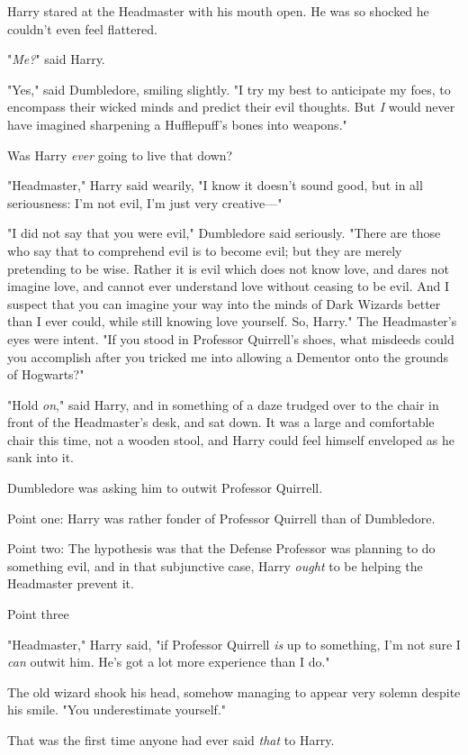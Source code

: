Harry stared at the Headmaster with his mouth open. He was so shocked he
couldn't even feel flattered.

"\emph{Me?}" said Harry.

"Yes," said Dumbledore, smiling slightly. "I try my best to anticipate my foes,
to encompass their wicked minds and predict their evil thoughts. But \emph{I}
would never have imagined sharpening a Hufflepuff's bones into weapons."

Was Harry \emph{ever} going to live that down?

"Headmaster," Harry said wearily, "I know it doesn't sound good, but in all
seriousness: I'm not evil, I'm just very creative\mbox{---}"

"I did not say that you were evil," Dumbledore said seriously. "There are those
who say that to comprehend evil is to become evil; but they are merely
pretending to be wise. Rather it is evil which does not know love, and dares
not imagine love, and cannot ever understand love without ceasing to be evil.
And I suspect that you can imagine your way into the minds of Dark Wizards
better than I ever could, while still knowing love yourself. So, Harry." The
Headmaster's eyes were intent. "If you stood in Professor Quirrell's shoes,
what misdeeds could you accomplish after you tricked me into allowing a
Dementor onto the grounds of Hogwarts?"

"Hold \emph{on}," said Harry, and in something of a daze trudged over to the
chair in front of the Headmaster's desk, and sat down. It was a large and
comfortable chair this time, not a wooden stool, and Harry could feel himself
enveloped as he sank into it.

Dumbledore was asking him to outwit Professor Quirrell.

Point one: Harry was rather fonder of Professor Quirrell than of Dumbledore.

Point two: The hypothesis was that the Defense Professor was planning to do
something evil, and in that subjunctive case, Harry \emph{ought} to be helping
the Headmaster prevent it.

Point three{\el}

"Headmaster," Harry said, "if Professor Quirrell \emph{is} up to something, I'm
not sure I \emph{can} outwit him. He's got a lot more experience than I do."

The old wizard shook his head, somehow managing to appear very solemn despite
his smile. "You underestimate yourself."

That was the first time anyone had ever said \emph{that} to Harry.

